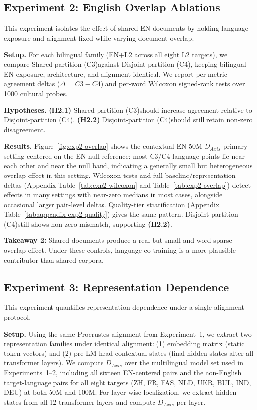 \documentclass[11pt]{article}
\newcommand{\ZHtag}{\textsc{ZH}}
\newcommand{\FRtag}{\textsc{FR}}
\newcommand{\FAStag}{\textsc{FAS}}
\newcommand{\NLDtag}{\textsc{NLD}}
\newcommand{\UKRtag}{\textsc{UKR}}
\newcommand{\BULtag}{\textsc{BUL}}
\newcommand{\INDtag}{\textsc{IND}}
\newcommand{\DEUtag}{\textsc{DEU}}
\newcommand{\SetupAName}{Shared-partition (C3)}
\newcommand{\SetupBName}{Disjoint-partition (C4)}
\begin{document}
\subsection{Experiment 2: English Overlap Ablations}
\label{sec:exp2}
This experiment isolates the effect of shared EN documents by holding language exposure and alignment fixed while varying document overlap.

\textbf{Setup.} For each bilingual family (EN+L2 across all eight L2 targets), we compare \SetupAName against \SetupBName, keeping bilingual EN exposure, architecture, and alignment identical. We report per-metric agreement deltas ($\Delta = C3 - C4$) and per-word Wilcoxon signed-rank tests over 1000 cultural probes.

\textbf{Hypotheses.} \textbf{(H2.1)} \SetupAName should increase agreement relative to \SetupBName. \textbf{(H2.2)} \SetupBName should still retain non-zero disagreement.

\textbf{Results.} Figure~\ref{fig:exp2-overlap} shows the contextual EN-50M $D_{Axis}$ primary setting centered on the EN-null reference: most C3/C4 language points lie near each other and near the null band, indicating a generally small but heterogeneous overlap effect in this setting. Wilcoxon tests and full baseline/representation deltas (Appendix Table~\ref{tab:exp2-wilcoxon} and Table~\ref{tab:exp2-overlap}) detect effects in many settings with near-zero medians in most cases, alongside occasional larger pair-level deltas. Quality-tier stratification (Appendix Table~\ref{tab:appendix-exp2-quality}) gives the same pattern. \SetupBName still shows non-zero mismatch, supporting \textbf{(H2.2)}.

\begin{insightbox}
\textbf{Takeaway 2:} Shared documents produce a real but small and word-sparse overlap effect. Under these controls, language co-training is a more plausible contributor than shared corpora.
\end{insightbox}

\subsection{Experiment 3: Representation Dependence}
\label{sec:exp3}
This experiment quantifies representation dependence under a single alignment protocol.

\textbf{Setup.} Using the same Procrustes alignment from Experiment~1, we extract two representation families under identical alignment: (1) embedding matrix (static token vectors) and (2) pre-LM-head contextual states (final hidden states after all transformer layers). We compute $D_{Axis}$ over the multilingual model set used in Experiments~1--2, including all sixteen EN-centered pairs and the non-English target-language pairs for all eight targets (\ZHtag, \FRtag, \FAStag, \NLDtag, \UKRtag, \BULtag, \INDtag, \DEUtag) at both 50M and 100M. For layer-wise localization, we extract hidden states from all 12 transformer layers and compute $D_{Axis}$ per layer.
\end{document}

